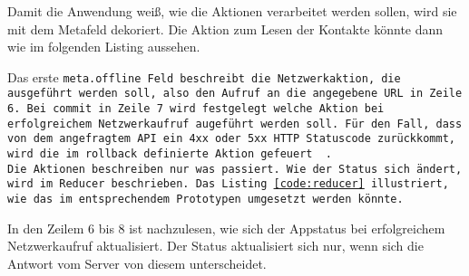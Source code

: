 Damit die Anwendung weiß, wie die Aktionen verarbeitet werden sollen, wird sie mit dem Metafeld dekoriert.
Die Aktion zum Lesen der Kontakte könnte dann wie im folgenden Listing aussehen.
%
\begin{center}
  
\end{center}
%
Das erste \tt{meta.offline} Feld beschreibt die Netzwerkaktion, die ausgeführt werden soll, also den Aufruf an die angegebene URL in Zeile 6.
Bei \tt{commit} in Zeile 7 wird festgelegt welche Aktion bei erfolgreichem Netzwerkaufruf augeführt werden soll.
Für den Fall, dass von dem angefragtem \gls{API} ein 4xx oder 5xx \gls{HTTP} Statuscode zurückkommt, wird die im \tt{rollback} definierte Aktion gefeuert ~\cite{redux-offline-npm}.\\
Die Aktionen beschreiben nur was passiert. Wie der Status sich ändert, wird im \tt{Reducer} beschrieben.
Das Listing \ref{code:reducer} illustriert, wie das im entsprechendem Prototypen umgesetzt werden könnte.
%
\begin{center}
  
\end{center}
%
In den Zeilem 6 bis 8 ist nachzulesen, wie sich der \gls{App}status bei erfolgreichem Netzwerkaufruf aktualisiert.
Der Status aktualisiert sich nur, wenn sich die Antwort vom Server von diesem unterscheidet.